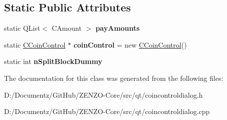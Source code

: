 \subsection*{Static Public Attributes}
\begin{DoxyCompactItemize}
\item 
\mbox{\label{class_coin_control_dialog_af4dd184087c7b34ac68392bec2968d15}} 
static Q\+List$<$ C\+Amount $>$ {\bfseries pay\+Amounts}
\item 
\mbox{\label{class_coin_control_dialog_a9d4514c4fbb1fe19cb3aa121da083bc7}} 
static \mbox{\hyperlink{class_c_coin_control}{C\+Coin\+Control}} $\ast$ {\bfseries coin\+Control} = new \mbox{\hyperlink{class_c_coin_control}{C\+Coin\+Control}}()
\item 
\mbox{\label{class_coin_control_dialog_ab50787868662bb57b74e298e2c6fe7de}} 
static int {\bfseries n\+Split\+Block\+Dummy}
\end{DoxyCompactItemize}


The documentation for this class was generated from the following files\+:\begin{DoxyCompactItemize}
\item 
D\+:/\+Documentz/\+Git\+Hub/\+Z\+E\+N\+Z\+O-\/\+Core/src/qt/coincontroldialog.\+h\item 
D\+:/\+Documentz/\+Git\+Hub/\+Z\+E\+N\+Z\+O-\/\+Core/src/qt/coincontroldialog.\+cpp\end{DoxyCompactItemize}

